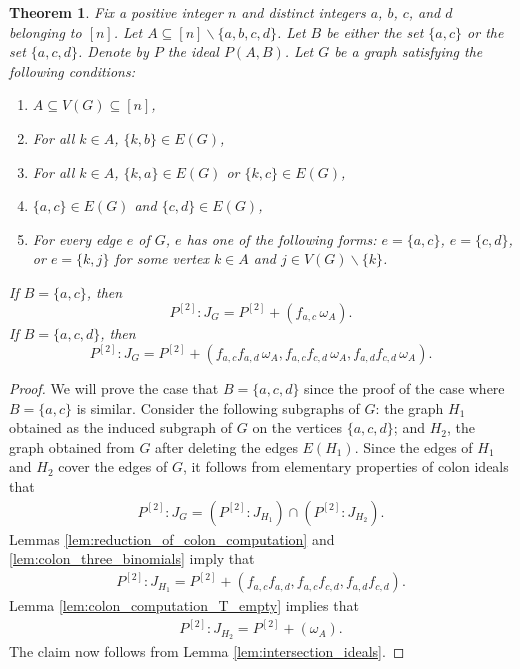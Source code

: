 \documentclass[12pt,a4paper]{amsart}
\theoremstyle{plain}
\newtheorem{thrm}{Theorem}[section]
\def\bthm{\begin{thrm}}
\def\ethm{\end{thrm}}
\theoremstyle{definition}
\def\bproof{\begin{proof}}
\def\eproof{\end{proof}}
\theoremstyle{remark}
\let\setminus=\smallsetminus
\renewcommand{\subset}{\subseteq}
\begin{document}
\bthm
\label{thrm:colon_minl_prime}
Fix a positive integer $n$ and distinct integers $a$, $b$, $c$, and $d$ belonging to $[n]$. Let $A \subset [n] \setminus \{a,b,c,d\}$. Let $B$ be either the set $\{a,c\}$ or the set $\{a,c,d\}$. Denote by $P$ the ideal $P(A,B)$. Let $G$ be a graph satisfying the following conditions:
\begin{enumerate}
\item $A \subset V(G) \subset [n]$,
\item For all $k \in A$, $\{k,b\} \in E(G)$,
\item For all $k \in A$, $\{k,a\} \in E(G)$ or $\{k,c\} \in E(G)$,
\item $\{a,c\} \in E(G)$ and $\{c,d\} \in E(G)$,
\item For every edge $e$ of $G$, $e$ has one of the following forms: $e = \{a,c\}$, $e = \{c,d\}$, or $e = \{k,j\}$ for some vertex $k \in A$ and $j \in V(G) \setminus \{k\}$.
\end{enumerate}
If $B = \{a,c\}$, then
\begin{equation}
\label{eqn:colon_minl_prime_1}
P^{[2]}:J_{G} = P^{[2]} + (f_{a,c} \, \omega_{A}).
\end{equation}
If $B = \{a,c,d\}$, then
\begin{equation}
\label{eqn:colon_minl_prime_2}
P^{[2]}:J_{G} = P^{[2]} + (f_{a,c}f_{a,d} \, \omega_{A}, f_{a,c}f_{c,d} \, \omega_{A}, f_{a,d}f_{c,d} \, \omega_{A}).
\end{equation}
\ethm 

\bproof
We will prove the case that $B = \{a,c,d\}$ since the proof of the case where $B = \{a,c\}$ is similar. Consider the following subgraphs of $G$: the graph $H_{1}$ obtained as the induced subgraph of $G$ on the vertices $\{a,c,d\}$; and $H_{2}$, the graph obtained from $G$ after deleting the edges $E(H_{1})$. Since the edges of $H_{1}$ and $H_{2}$ cover the edges of $G$, it follows from elementary properties of colon ideals that
\begin{align*}
    P^{[2]}:J_{G} = \left( P^{[2]}:J_{H_{1}} \right) \cap \left( P^{[2]}:J_{H_{2}} \right).
\end{align*}
Lemmas \ref{lem:reduction_of_colon_computation} and \ref{lem:colon_three_binomials} imply that 
\begin{align*}
    P^{[2]}:J_{H_{1}} = P^{[2]} + (f_{a,c}f_{a,d}, f_{a,c}f_{c,d}, f_{a,d}f_{c,d}).
\end{align*}
Lemma \ref{lem:colon_computation_T_empty} implies that
\begin{align*}
    P^{[2]}:J_{H_{2}} = P^{[2]} + (\omega_{A}).
\end{align*}
The claim now follows from Lemma \ref{lem:intersection_ideals}.
\eproof
\end{document}
